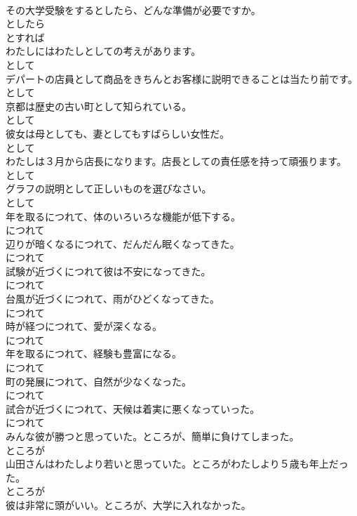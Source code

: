 \documentclass[8pt]{extreport}
\begin{document}
\begin{CJK}{UTF8}{min}
\\	その大学受験をするとしたら、どんな準備が必要ですか。	
\\	としたら 
\\	とすれば	
\\	わたしにはわたしとしての考えがあります。	
\\	として	
\\	デパートの店員として商品をきちんとお客様に説明できることは当たり前です。	
\\	として	
\\	京都は歴史の古い町として知られている。	
\\	として	
\\	彼女は母としても、妻としてもすばらしい女性だ。	
\\	として	
\\	わたしは３月から店長になります。店長としての責任感を持って頑張ります。	
\\	として	
\\	グラフの説明として正しいものを選びなさい。	
\\	として	
\\	年を取るにつれて、体のいろいろな機能が低下する。	
\\	につれて	
\\	辺りが暗くなるにつれて、だんだん眠くなってきた。	
\\	につれて	
\\	試験が近づくにつれて彼は不安になってきた。	
\\	につれて	
\\	台風が近づくにつれて、雨がひどくなってきた。	
\\	につれて	
\\	時が経つにつれて、愛が深くなる。	
\\	につれて	
\\	年を取るにつれて、経験も豊富になる。	
\\	につれて	
\\	町の発展につれて、自然が少なくなった。	
\\	につれて	
\\	試合が近づくにつれて、天候は着実に悪くなっていった。	
\\	につれて	
\\	みんな彼が勝つと思っていた。ところが、簡単に負けてしまった。	
\\	ところが	
\\	山田さんはわたしより若いと思っていた。ところがわたしより５歳も年上だった。	
\\	ところが	
\\	彼は非常に頭がいい。ところが、大学に入れなかった。	

\end{CJK}
\end{document}
